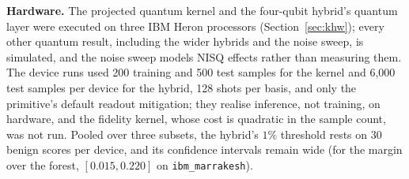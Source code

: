 \textbf{Hardware.} The projected quantum kernel and the four-qubit hybrid's quantum layer were executed
on three IBM Heron processors (Section~\ref{sec:khw}); every other quantum result, including the wider
hybrids and the noise sweep, is simulated, and the noise sweep models NISQ effects rather than measuring
them. The device runs used 200 training and 500 test samples for the kernel and 6{,}000 test samples per
device for the hybrid, 128 shots per basis, and only the primitive's default readout mitigation; they
realise inference, not training, on hardware, and the fidelity kernel, whose cost is quadratic in the
sample count, was not run. Pooled over three subsets, the hybrid's $1\%$ threshold rests on 30 benign
scores per device, and its confidence intervals remain wide (for the margin over the forest,
$[0.015,0.220]$ on \texttt{ibm\_marrakesh}).

